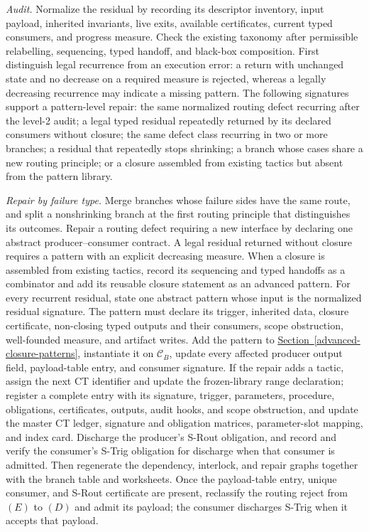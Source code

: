 \documentclass[
  11pt,
]{article}
\theoremstyle{definition}
\newcommand{\secref}[1]{\hyperref[#1]{Section~\ref*{#1}}}
\begin{document}
\begin{enumerate}
  \emph{Audit.} Normalize the residual by recording its descriptor
  inventory, input payload, inherited invariants, live exits, available
  certificates, current typed consumers, and progress measure. Check the
  existing taxonomy after permissible relabelling, sequencing, typed
  handoff, and black-box composition. First distinguish legal recurrence
  from an execution error: a return with unchanged state and no decrease
  on a required measure is rejected, whereas a legally decreasing
  recurrence may indicate a missing pattern. The following signatures
  support a pattern-level repair: the same normalized routing defect
  recurring after the level-2 audit; a legal typed residual repeatedly
  returned by its declared consumers without closure; the same defect class
  recurring in two or more branches; a residual that repeatedly stops
  shrinking; a branch whose cases share a new routing principle; or a
  closure assembled from existing tactics but absent from the pattern
  library.

  \emph{Repair by failure type.} Merge branches whose failure sides have
  the same route, and split a nonshrinking branch at the first routing
  principle that distinguishes its outcomes. Repair a routing defect
  requiring a new interface by declaring one abstract producer--consumer
  contract. A legal residual returned without closure requires a pattern
  with an explicit decreasing measure. When a closure is assembled from existing tactics,
  record its sequencing and typed handoffs as a combinator and add its
  reusable closure statement as an advanced pattern. For every recurrent
  residual, state one abstract pattern whose input is
  the normalized residual signature. The pattern must declare its
  trigger, inherited data, closure certificate, non-closing typed outputs
  and their consumers, scope obstruction, well-founded measure, and
  artifact writes. Add the pattern to
  \secref{advanced-closure-patterns}, instantiate it on \(\mathcal C_B\),
  update every affected producer output field, payload-table entry, and
  consumer signature. If the repair adds a tactic, assign the next CT
  identifier and update the frozen-library range declaration; register a
  complete entry with its signature, trigger, parameters, procedure,
  obligations, certificates, outputs, audit hooks, and scope obstruction,
  and update the master CT ledger, signature and obligation matrices,
  parameter-slot mapping, and index card. Discharge the producer's
  S-Rout obligation, and record and verify the consumer's S-Trig
  obligation for discharge when that consumer is admitted. Then
  regenerate the dependency, interlock, and repair graphs together with
  the branch table and worksheets. Once the payload-table entry, unique
  consumer, and S-Rout certificate are present, reclassify the routing
  reject from \((E)\) to \((D)\) and admit its payload; the consumer
  discharges S-Trig when it accepts that payload.


\end{enumerate}
\end{document}
